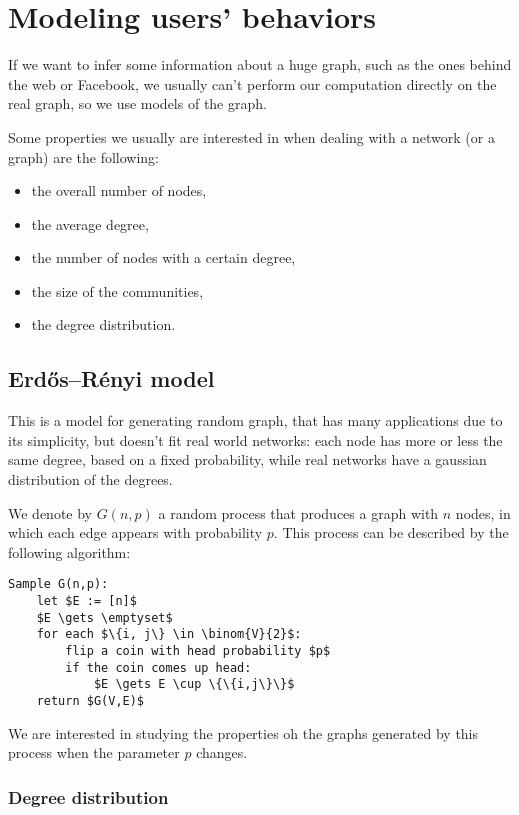 \chapter{Modeling users' behaviors}\label{sec:users-behaviors}

    If we want to infer some information about a huge graph, such as the ones behind the web or Facebook, we usually can't perform our computation directly on the real graph, so we use models of the graph.

    Some properties we usually are interested in when dealing with a network (or a graph) are the following:
    \begin{itemize}
        \item the overall number of nodes,
        \item the average degree,
        \item the number of nodes with a certain degree,
        \item the size of the communities,
        \item the degree distribution.
    \end{itemize}


\section{Erdős–Rényi model}\label{sec:gnp}
    
    This is a model for generating random graph, that has many applications due to its simplicity, but doesn't fit real world networks: each node has more or less the same degree, based on a fixed probability, while real networks have a gaussian distribution of the degrees.
    
    We denote by $G(n, p)$ a random process that produces a graph with $n$ nodes, in which each edge appears with probability $p$. This process can be described by the following algorithm:
    \begin{lstlisting}[caption={The G(n,p) algorithm},label={lst:gnp}]
Sample G(n,p):
    let $E := [n]$
    $E \gets \emptyset$
    for each $\{i, j\} \in \binom{V}{2}$:
        flip a coin with head probability $p$
        if the coin comes up head:
            $E \gets E \cup \{\{i,j\}\}$
    return $G(V,E)$
    \end{lstlisting}
    
    We are interested in studying the properties oh the graphs generated by this process when the parameter $p$ changes.
    

\subsection{Degree distribution}\label{sec:gnp-degree}

